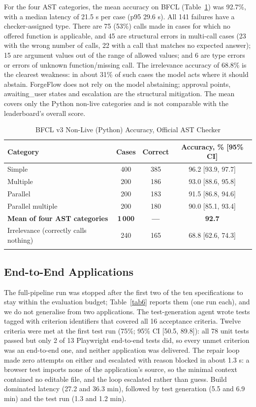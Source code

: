 \documentclass[pdflatex,sn-mathphys-num]{sn-jnl}%
\theoremstyle{thmstyleone}%
\theoremstyle{thmstyletwo}%
\theoremstyle{thmstylethree}%
\begin{document}
For the four AST categories, the mean accuracy on BFCL (Table~\ref{tab5}) was 92.7\%, with a median latency of 21.5 s per case (p95 29.6 s). All 141 failures have a checker-assigned type. There are 75 (53\%) calls made in cases for which no offered function is applicable, and 45 are structural errors in multi-call cases (23 with the wrong number of calls, 22 with a call that matches no expected answer); 15 are argument values out of the range of allowed values; and 6 are type errors or errors of unknown function/missing call. The irrelevance accuracy of 68.8\% is the clearest weakness: in about 31\% of such cases the model acts where it should abstain. ForgeFlow does not rely on the model abstaining; approval points, awaiting\_user states and escalation are the structural mitigation. The mean covers only the Python non-live categories and is not comparable with the leaderboard's overall score.

\begin{table}[t]
\caption{BFCL v3 Non-Live (Python) Accuracy, Official AST Checker}\label{tab5}%
\small
\begin{tabular*}{\textwidth}{@{\extracolsep\fill}lccc@{}}
\toprule
\textbf{Category} & \textbf{Cases} & \textbf{Correct} & \textbf{Accuracy, \% [95\% CI]} \\
\midrule
Simple & 400 & 385 & 96.2 [93.9, 97.7] \\
Multiple & 200 & 186 & 93.0 [88.6, 95.8] \\
Parallel & 200 & 183 & 91.5 [86.8, 94.6] \\
Parallel multiple & 200 & 180 & 90.0 [85.1, 93.4] \\
\textbf{Mean of four AST categories} & \textbf{1\,000} & \textbf{---} & \textbf{92.7} \\
Irrelevance (correctly calls nothing) & 240 & 165 & 68.8 [62.6, 74.3] \\
\botrule
\end{tabular*}
\end{table}

\subsection{End-to-End Applications}\label{sec8.5}

The full-pipeline run was stopped after the first two of the ten specifications to stay within the evaluation budget; Table~\ref{tab6} reports them (one run each), and we do not generalise from two applications. The test-generation agent wrote tests tagged with criterion identifiers that covered all 16 acceptance criteria. Twelve criteria were met at the first test run (75\%; 95\% CI [50.5, 89.8]): all 78 unit tests passed but only 2 of 13 Playwright end-to-end tests did, so every unmet criterion was an end-to-end one, and neither application was delivered. The repair loop made zero attempts on either and escalated with reason blocked in about 1.3 s: a browser test imports none of the application's source, so the minimal context contained no editable file, and the loop escalated rather than guess. Build dominated latency (27.2 and 36.3 min), followed by test generation (5.5 and 6.9 min) and the test run (1.3 and 1.2 min).
\end{document}
